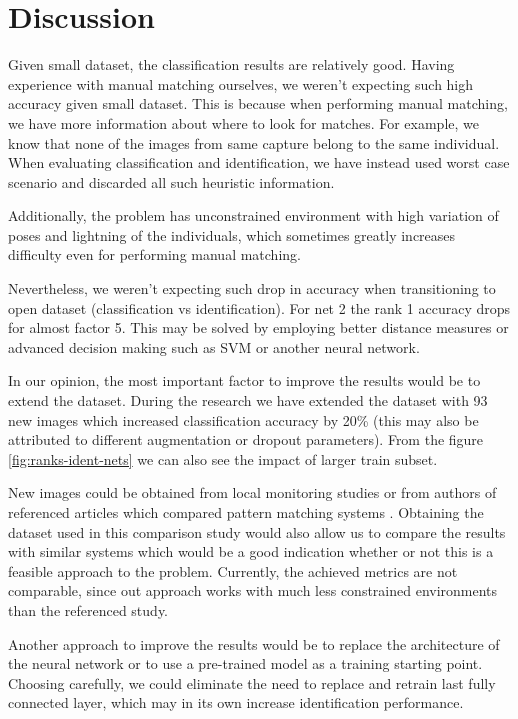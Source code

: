 \documentclass[fleqn,moreauthors,10pt]{ds_report}
\begin{document}
\section*{Discussion}

Given small dataset, the classification results are relatively good. Having experience with manual matching ourselves, we weren't expecting such high accuracy given small dataset. This is because when performing manual matching, we have more information about where to look for matches. For example, we know that none of the images from same capture belong to the same individual. When evaluating classification and identification, we have instead used worst case scenario and discarded all such heuristic information.

Additionally, the problem has unconstrained environment with high variation of poses and lightning of the individuals, which sometimes greatly increases difficulty even for performing manual matching.

Nevertheless, we weren't expecting such drop in accuracy when transitioning to open dataset (classification vs identification). For net 2 the rank 1 accuracy drops for almost factor 5. This may be solved by employing better distance measures or advanced decision making such as SVM or another neural network.

In our opinion, the most important factor to improve the results would be to extend the dataset. During the research we have extended the dataset with 93 new images which increased classification accuracy by 20\% (this may also be attributed to different augmentation or dropout parameters). From the figure \ref{fig:ranks-ident-nets} we can also see the impact of larger train subset. 

New images could be obtained from local monitoring studies or from authors of referenced articles which compared pattern matching systems \cite{ident_comparison}. Obtaining the dataset used in this comparison study would also allow us to compare the results with similar systems which would be a good indication whether or not this is a feasible approach to the problem. Currently, the achieved metrics are not comparable, since out approach works with much less constrained environments than the referenced study.

Another approach to improve the results would be to replace the architecture of the neural network or to use a pre-trained model as a training starting point. Choosing carefully, we could eliminate the need to replace and retrain last fully connected layer, which may in its own increase identification performance.



\end{document}
